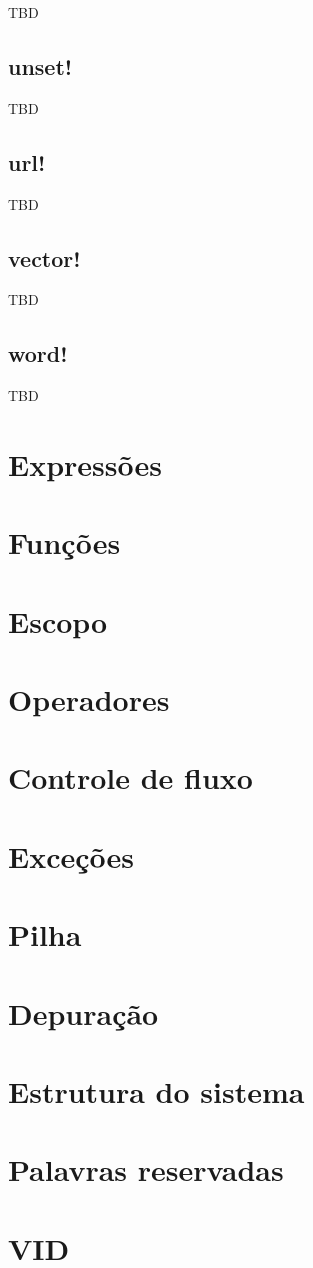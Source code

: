\documentclass[12pt,a4paper]{article}
\begin{document}
TBD

\subsection{unset!}

TBD

\subsection{url!}

TBD

\subsection{vector!}

TBD

\subsection{word!}

TBD


\section{Expressões}
\section{Funções}\label{sec:func}
\section{Escopo}
\section{Operadores}
\section{Controle de fluxo}
\section{Exceções}
\section{Pilha}
\section{Depuração}
\section{Estrutura do sistema}
\section{Palavras reservadas}
\section{VID}
\end{document}
